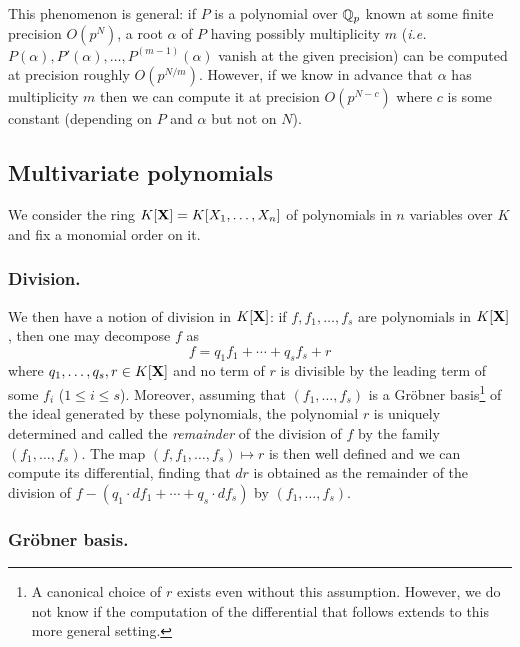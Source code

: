 \documentclass{lms}
\begin{document}
This phenomenon is general: if $P$ is a polynomial over $\mathbb Q_p$ known at 
some finite precision $O(p^N)$, a root $\alpha$ of $P$ having possibly 
multiplicity $m$ (\emph{i.e.} $P(\alpha), P'(\alpha), \ldots, P^{(m-1)} 
(\alpha)$ vanish at the given precision) can be computed at precision 
roughly $O(p^{N/m})$. However, if we know in advance that $\alpha$ has 
multiplicity $m$ then we can compute it at precision $O(p^{N-c})$ 
where $c$ is some constant (depending on $P$ and $\alpha$ but not on
$N$).

\subsection{Multivariate polynomials}

We consider the ring $K[\mathbf X] = K[X_1, \ldots, X_n]$ of polynomials in $n$
variables over $K$ and fix a monomial order on it. 

\subsubsection*{Division.}

We then have a notion of division in $K[\mathbf X]$: if $f, f_1, \ldots, f_s$ 
are polynomials in $K[\mathbf X]$, then one may decompose $f$ as
$$f = q_1 f_1 + \cdots + q_s f_s + r$$
where $q_1, \ldots, q_s, r \in K[\mathbf X]$ and no term of $r$ is divisible
by the leading term of some $f_i$ ($1 \leq i \leq s$). Moreover, assuming
that $(f_1, \ldots, f_s)$ is a Gr\"obner basis\footnote{A canonical choice of $r$ exists even without this
assumption. However, we do not know
if the computation of the differential that follows extends to this more
general setting.} of the ideal generated by these polynomials, the 
polynomial $r$ is uniquely determined and called the \emph{remainder} of 
the division of $f$ by the family $(f_1, \ldots, f_s)$. The map 
$(f, f_1, \ldots, f_s) \mapsto r$ is then well defined and we can compute its differential,
finding that $dr$ is obtained as the remainder of the division of $f - (q_1 
\cdot d f_1 + \cdots + q_s \cdot d f_s)$ by $(f_1, \ldots, f_s)$.

\subsubsection*{Gr\"obner basis.}
\end{document}
